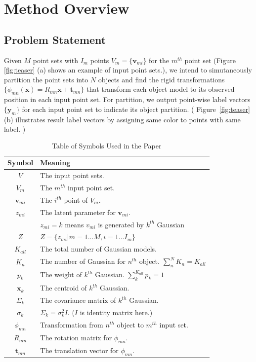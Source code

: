 \section{Method Overview}
\label{sec:method}
\subsection{Problem Statement}
Given $M$ point sets with $I_m$ points $V_m=\{\pmb{v}_{mi}\}$ for the $m^{th}$ point set (Figure \ref{fig:teaser} (a) shows an example of input point sets.), we intend to simutaneously partition the point sets into $N$ objects and find the rigid transformations $\{\phi_{mn}(\pmb{x})=R_{mn}\pmb{x}+\pmb{t}_{mn}\}$ that transform each object model to its observed position in each input point set.  For partition, we output point-wise label vectors $\{\pmb y_m\}$ for each input point set to indicate its object partition. ( Figure~\ref{fig:teaser} (b) illustrates result label vectors by assigning same color to points with same label. )
\begin{table}[!hbp]
\centering
\begin{tabular}{c l}
\hline
Symbol & Meaning\\
\hline
$V$ & The input point sets.\\
$V_m$ & The $m^{th}$ input point set.\\
$\pmb v_{mi}$ & The $i^{th}$ point of $V_m$.\\
$z_{mi}$ & The latent parameter for $\pmb v_{mi}$.\\
& $z_{mi}=k$ means $v_{mi}$ is generated by $k^{th}$ Gaussian\\
$Z$ & $Z=\{z_{mi}|m=1...M,i=1...I_m\}$\\
$K_{all}$ & The total number of Gaussian models.\\
$K_n$   & The number of Gaussian for $n^{th}$ object. $\sum_n^N K_n = K_{all}$\\
$p_k$  & The weight of $k^{th}$ Gaussian. $\sum_k^{K_{all}}p_k=1$\\
$\pmb x_k$ & The centroid of $k^{th}$ Gaussian.\\
$\Sigma_k$ & The covariance matrix of $k^{th}$ Gaussian.\\
$\sigma_k$ & $\Sigma_k=\sigma_k^2I$. ($I$ is identity matrix here.)\\
$\phi_{mn}$ & Transformation from $n^{th}$ object to $m^{th}$ input set.\\
$R_{mn}$ & The rotation matrix for $\phi_{mn}$.\\
$\pmb t_{mn}$ & The translation vector for $\phi_{mn}$.
\end{tabular}
\caption{Table of Symbols Used in the Paper}

\end{table}
